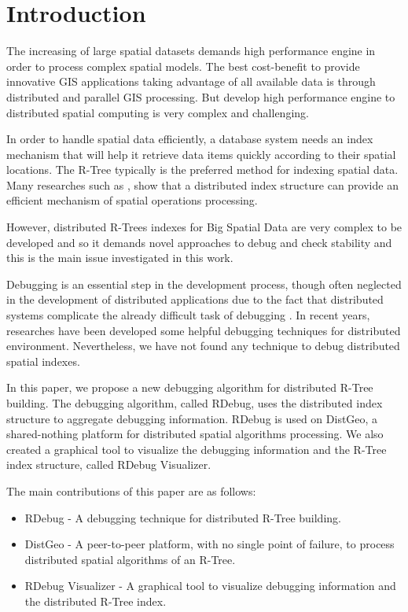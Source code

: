 \section{Introduction}
\label{sec:intro}

The increasing of large spatial datasets demands high performance engine in order to process complex spatial models. 
The best cost-benefit to provide innovative GIS applications taking advantage of all available data is through distributed and parallel GIS processing. 
But develop high performance engine to distributed spatial computing is very complex and challenging.

In order to handle spatial data efficiently, a database system needs an index mechanism that will help it retrieve data items quickly according to their spatial locations. 
The R-Tree typically is the preferred method for indexing spatial data. Many researches such as  \cite{an1999storing,dedsi,zhong2012towards}, 
show that a distributed index structure can provide an efficient mechanism of spatial operations processing.

However, distributed R-Trees indexes for Big Spatial Data are very complex to be developed and so it demands novel approaches to debug and check stability and this is the main issue investigated in this work.

Debugging is an essential step in the development process, though often neglected in the development of distributed applications 
due to the fact that distributed systems complicate the already difficult task of debugging \cite{cheung1990Framework}.
In recent years, researches have been developed some helpful debugging techniques for distributed environment. 
Nevertheless, we have not found any technique to debug distributed spatial indexes.

In this paper, we propose a new debugging algorithm for distributed R-Tree building. 
The debugging algorithm, called RDebug, uses the distributed index structure to aggregate debugging information. 
RDebug is used on DistGeo, a shared-nothing platform for distributed spatial algorithms processing. 
We also created a graphical tool to visualize the debugging information and the R-Tree index structure, called RDebug Visualizer. 

The main contributions of this paper are as follows:

\begin{itemize}
  \item RDebug - A debugging technique for distributed R-Tree building.
  \item DistGeo - A peer-to-peer platform, with no single point of failure, to process distributed spatial algorithms of an R-Tree.
  \item RDebug Visualizer - A graphical tool to visualize debugging information and the distributed R-Tree index.
\end{itemize}

